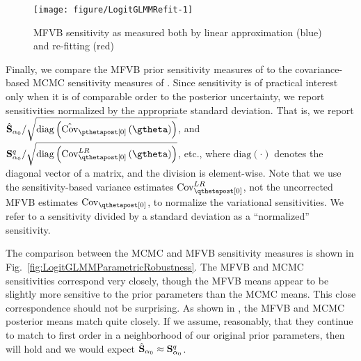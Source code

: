 \documentclass{article}\usepackage[]{graphicx}\usepackage[]{color}
\newenvironment{knitrout}{}{}
\theoremstyle{definition}
\theoremstyle{plain}
\theoremstyle{plain}
\theoremstyle{plain}
\theoremstyle{definition}
\theoremstyle{plain}
\theoremstyle{plain}
\newcommand{\fig}[1]{Fig.~\ref{fig:#1}}
\begin{document}
\begin{knitrout}
\color{fgcolor}\begin{figure}[t]

{\centering \texttt{[image: figure/LogitGLMMRefit-1]} 

}

\caption[MFVB sensitivity as measured both by linear approximation (blue) and re-fitting (red)]{MFVB sensitivity as measured both by linear approximation (blue) and re-fitting (red)}\label{fig:LogitGLMMRefit}
\end{figure}


\end{knitrout}
Finally, we compare the MFVB prior sensitivity measures of 
to the covariance-based MCMC sensitivity measures of .
Since sensitivity is of practical interest only when it is of comparable
order to the posterior uncertainty, we report sensitivities normalized
by the appropriate standard deviation. That is, we report
$\psenshat/\sqrt{\textrm{diag}\left(\hat{\cov}_{\pzeropost}\left(\gtheta\right)\right)}$,
and $\qsens/\sqrt{\textrm{diag}\left(\lrvbcov\left(\gtheta\right)\right)}$,
etc., where $\textrm{diag}\left(\cdot\right)$ denotes the diagonal
vector of a matrix, and the division is element-wise. Note that we
use the sensitivity-based variance estimates $\lrvbcov$, not the
uncorrected MFVB estimates $\qcov$, to normalize the variational
sensitivities. We refer to a sensitivity divided by a standard deviation
as a ``normalized'' sensitivity.

The comparison between the MCMC and MFVB sensitivity measures is shown in
\fig{LogitGLMMParametricRobustness}. The MFVB and MCMC sensitivities correspond
very closely, though the MFVB means appear to be slightly more sensitive to the
prior parameters than the MCMC means. This close correspondence should not be
surprising. As shown in , the MFVB
and MCMC posterior means match quite closely. If we assume, reasonably, that
they continue to match to first order
in a neighborhood of our original prior parameters, then
 will hold and we would expect
$\hat{\mathbf{S}}_{\alpha_{0}}\approx\mathbf{S}_{\alpha_{0}}^{q}$.
\end{document}
